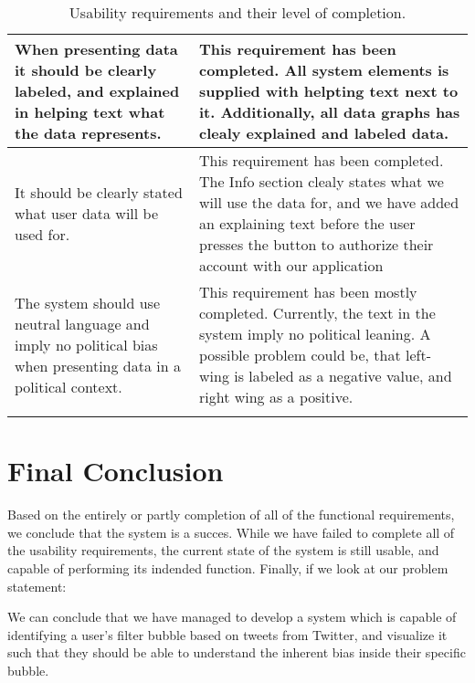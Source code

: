\begin{longtable}{|p{6cm}|p{8cm}|}
When presenting data it should be clearly labeled, and explained in
helping text what the data represents.
& This requirement has been completed. All system elements is supplied with
helpting text next to it. Additionally, all data graphs has clealy explained and
labeled data. \\\hline
It should be clearly stated what user data will be used for.
&	This requirement has been completed. The Info section clealy states what we
will use the data for, and we have added an explaining text before the user
presses the button to authorize their account with our application \\\hline
The system should use neutral language and imply no political bias when
presenting data in a political context.
&	This requirement has been mostly completed. Currently, the text in the system
imply no political leaning. A possible problem could be, that left-wing
is labeled as a negative value, and right wing as a positive.\\\hline
\caption{Usability requirements and their level of completion.}
\label{table:concUsaReq}
\end{longtable}

\section{Final Conclusion}
Based on the entirely or partly completion of all of the functional
requirements, we conclude that the system is a succes. While we have failed to
complete all of the usability requirements, the current state of the system is
still usable, and capable of performing its indended function. Finally, if we
look at our problem statement:\nl

\nl

We can conclude that we have managed to develop a system which is capable of
identifying a user's filter bubble based on tweets from Twitter, and visualize
it such that they should be able to understand the inherent bias inside their
specific bubble.




















